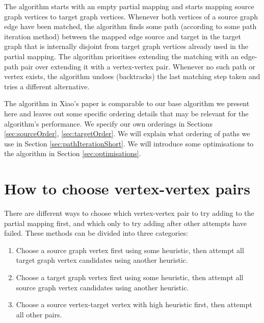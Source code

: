 The algorithm starts with an empty partial mapping and starts mapping source graph vertices to target graph vertices. Whenever both vertices of a source graph edge have been matched, the algorithm finds some path (according to some path iteration method) between the mapped edge source and target in the target graph that is internally disjoint from target graph vertices already used in the partial mapping. The algorithm prioritises extending the matching with an edge-path pair over extending it with a vertex-vertex pair. Whenever no such path or vertex exists, the algorithm undoes (backtracks) the last matching step taken and tries a different alternative. %

The algorithm in Xiao's paper is comparable to our base algorithm we present here and leaves out some specific ordering details that may be relevant for the algorithm's performance. We specify our own orderings in Sections \ref{sec:sourceOrder}, \ref{sec:targetOrder}. We will explain what ordering of paths we use in Section \ref{sec:pathIterationShort}. We will introduce some optimisations to the algorithm in Section \ref{sec:optimisations}.

\section{How to choose vertex-vertex pairs}
There are different ways to choose which vertex-vertex pair to try adding to the partial mapping first, and which only to try adding after other attempts have failed. These methods can be divided into three categories:

\begin{enumerate}
\item Choose a source graph vertex first using some heuristic, then attempt all target graph vertex candidates using another heuristic.
\item Choose a target graph vertex first using some heuristic, then attempt all source graph vertex candidates using another heuristic.
\item Choose a source vertex-target vertex with high heuristic first, then attempt all other pairs.
\end{enumerate}

